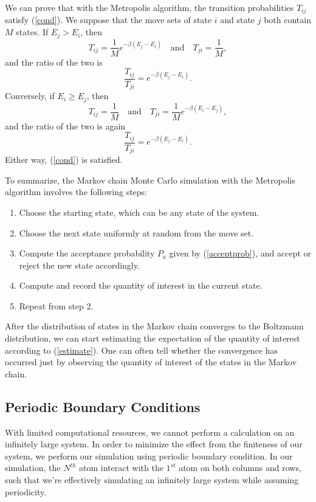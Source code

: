 \documentclass[11pt]{article}
\begin{document}
We can prove that with the Metropolis algorithm, the transition probabilities $T_{ij}$ satisfy (\ref{cond}). We suppose that the move sets of state $i$ and state $j$ both contain $M$ states. If $E_j > E_i$, then
\begin{equation}
    T_{ij} = \frac{1}{M} e^{-\beta (E_j - E_i)} \quad \text{and} \quad T_{ji} = \frac{1}{M},
\end{equation}
and the ratio of the two is
\begin{equation}
    \frac{T_{ij}}{T_{ji}} = e^{-\beta (E_j - E_i)}.
\end{equation}
Conversely, if $E_i \geq E_j$, then
\begin{equation}
    T_{ij} = \frac{1}{M} \quad \text{and} \quad T_{ji} = \frac{1}{M} e^{-\beta (E_i - E_j)},
\end{equation}
and the ratio of the two is again
\begin{equation}
    \frac{T_{ij}}{T_{ji}} = e^{-\beta (E_j - E_i)}.
\end{equation}
Either way, (\ref{cond}) is satisfied.

To summarize, the Markov chain Monte Carlo simulation with the Metropolis algorithm involves the following steps:
\begin{enumerate}
    \item Choose the starting state, which can be any state of the system.
    \item Choose the next state uniformly at random from the move set.
    \item Compute the acceptance probability $P_a$ given by (\ref{acceptprob}), and accept or reject the new state accordingly.
    \item Compute and record the quantity of interest in the current state.
    \item Repeat from step 2.
\end{enumerate}
After the distribution of states in the Markov chain converges to the Boltzmann distribution, we can start estimating the expectation of the quantity of interest according to (\ref{estimate}). One can often tell whether the convergence has occurred just by observing the quantity of interest of the states in the Markov chain.

\subsection{Periodic Boundary Conditions}

With limited computational resources, we cannot perform a calculation on an infinitely large system. In order to minimize the effect from the finiteness of our system, we perform our simulation using periodic boundary condition. In our simulation, the $N^{th}$ atom interact with the $1^{st}$ atom on both columns and rows, such that we're effectively simulating an infinitely large system while assuming periodicity.
\end{document}
